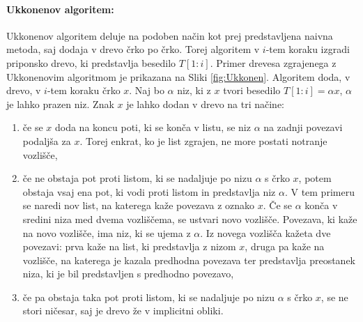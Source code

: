 \paragraph{Ukkonenov algoritem:}
Ukkonenov algoritem deluje na podoben način kot prej predstavljena naivna metoda, saj dodaja v drevo črko po črko. Torej algoritem v $i$-tem koraku izgradi priponsko drevo, ki predstavlja besedilo $T[1:i]$. Primer drevesa zgrajenega z Ukkonenovim algoritmom je prikazana na Sliki \ref{fig:Ukkonen}. Algoritem doda, v drevo, v $i$-tem koraku črko $x$. Naj bo $\alpha$ niz, ki z $x$ tvori besedilo $T[1:i]=\alpha x$, $\alpha$ je lahko prazen niz. Znak $x$ je lahko dodan v drevo na tri načine:

\begin{enumerate}
    \item če se $x$ doda na koncu poti, ki se konča v listu, se niz $\alpha$ na zadnji povezavi podaljša za $x$. Torej enkrat, ko je list zgrajen, ne more postati notranje vozlišče, 
    \item če ne obstaja pot proti listom, ki se nadaljuje po nizu $\alpha$ s črko $x$, potem obstaja vsaj ena pot, ki vodi proti listom in predstavlja niz $\alpha$. V tem primeru se naredi nov list, na katerega kaže povezava z oznako $x$. Če se $\alpha$ konča v sredini niza med dvema vozliščema, se ustvari novo vozlišče. Povezava, ki kaže na novo vozlišče, ima niz, ki se ujema z $\alpha$. Iz novega vozlišča kažeta dve povezavi: prva kaže na list, ki predstavlja z nizom $x$, druga pa kaže na vozlišče, na katerega je kazala predhodna povezava ter predstavlja preostanek niza, ki je bil predstavljen s predhodno povezavo,
    \item če pa obstaja taka pot proti listom, ki se nadaljuje po nizu $\alpha$ s črko $x$, se  ne stori ničesar, saj je drevo že v implicitni obliki.
\end{enumerate}

